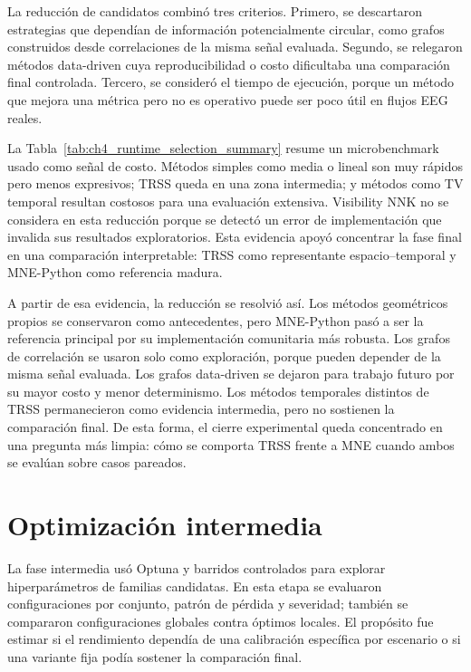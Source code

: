 La reducción de candidatos combinó tres criterios. Primero, se descartaron estrategias que dependían de información potencialmente circular, como grafos construidos desde correlaciones de la misma señal evaluada. Segundo, se relegaron métodos data-driven cuya reproducibilidad o costo dificultaba una comparación final controlada. Tercero, se consideró el tiempo de ejecución, porque un método que mejora una métrica pero no es operativo puede ser poco útil en flujos EEG reales.

La Tabla~\ref{tab:ch4_runtime_selection_summary} resume un microbenchmark usado como señal de costo. Métodos simples como media o lineal son muy rápidos pero menos expresivos; TRSS queda en una zona intermedia; y métodos como TV temporal resultan costosos para una evaluación extensiva. Visibility NNK no se considera en esta reducción porque se detectó un error de implementación que invalida sus resultados exploratorios. Esta evidencia apoyó concentrar la fase final en una comparación interpretable: TRSS como representante espacio--temporal y MNE-Python como referencia madura.



A partir de esa evidencia, la reducción se resolvió así. Los métodos geométricos propios se conservaron como antecedentes, pero MNE-Python pasó a ser la referencia principal por su implementación comunitaria más robusta. Los grafos de correlación se usaron solo como exploración, porque pueden depender de la misma señal evaluada. Los grafos data-driven se dejaron para trabajo futuro por su mayor costo y menor determinismo. Los métodos temporales distintos de TRSS permanecieron como evidencia intermedia, pero no sostienen la comparación final. De esta forma, el cierre experimental queda concentrado en una pregunta más limpia: cómo se comporta TRSS frente a MNE cuando ambos se evalúan sobre casos pareados.

\section{Optimización intermedia}

La fase intermedia usó Optuna y barridos controlados para explorar hiperparámetros de familias candidatas. En esta etapa se evaluaron configuraciones por conjunto, patrón de pérdida y severidad; también se compararon configuraciones globales contra óptimos locales. El propósito fue estimar si el rendimiento dependía de una calibración específica por escenario o si una variante fija podía sostener la comparación final.

